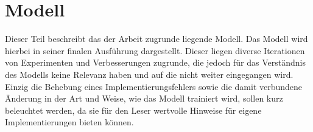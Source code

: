 \chapter{Modell}
\label{ch:model}

Dieser Teil beschreibt das der Arbeit zugrunde liegende Modell.
Das Modell wird hierbei in seiner finalen Ausführung dargestellt.
Dieser liegen diverse Iterationen von Experimenten und Verbesserungen zugrunde, die jedoch für das Verständnis des
Modells keine Relevanz haben und auf die nicht weiter eingegangen wird.
Einzig die Behebung eines Implementierungsfehlers sowie die damit verbundene Änderung in der Art und Weise, wie das Modell trainiert wird,
sollen kurz beleuchtet werden, da sie für den Leser wertvolle Hinweise für eigene Implementierungen bieten können.




